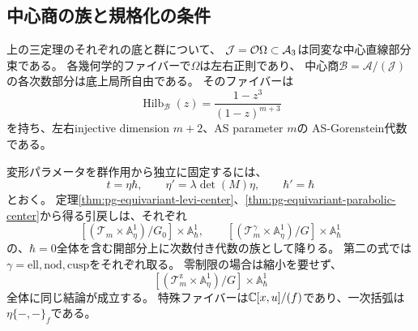 \subsection{中心商の族と規格化の条件}

\begin{corollary}[同変な正則中心商族]
\label{cor:pg-equivariant-central-quotient}
上の三定理のそれぞれの底と群について、
$\mathcal J=\mathcal O\Omega\subset\mathcal A_3$は同変な中心直線部分束である。
各幾何学的ファイバーで$\Omega$は左右正則であり、
中心商$\mathcal B=\mathcal A/(\mathcal J)$の各次数部分は底上局所自由である。
そのファイバーは
\begin{equation}
 \operatorname{Hilb}_{\mathcal B}(z)
 =\frac{1-z^3}{(1-z)^{m+3}}
 \label{eq:pg-equivariant-quotient-hilbert}
\end{equation}
を持ち、左右injective dimension $m+2$、AS parameter $m$の
AS-Gorenstein代数である。

変形パラメータを群作用から独立に固定するには、
\begin{equation}
 t=\eta\hbar,\qquad
 \eta'=\lambda\det(M)\eta,\qquad \hbar'=\hbar
 \label{eq:pg-equivariant-fixed-parameter}
\end{equation}
とおく。
定理\ref{thm:pg-equivariant-levi-center}、\ref{thm:pg-equivariant-parabolic-center}から得る引戻しは、それぞれ
\begin{equation}
 \left[(\mathcal T_m\times\mathbb A^1_\eta)/G_0\right]
       \times\mathbb A^1_\hbar,
 \qquad
 \left[(\mathcal T_m^\gamma\times\mathbb A^1_\eta)/G\right]
       \times\mathbb A^1_\hbar
 \label{eq:pg-equivariant-quotient-stacks}
\end{equation}
の、$\hbar=0$全体を含む開部分上に次数付き代数の族として降りる。
第二の式では$\gamma=\mathrm{ell},\mathrm{nod},\mathrm{cusp}$をそれぞれ取る。
零制限の場合は縮小を要せず、
\begin{equation}
 \left[(\mathcal T_m^{\mathrm z}\times\mathbb A^1_\eta)/G\right]
       \times\mathbb A^1_\hbar
 \label{eq:pg-equivariant-zero-quotient-stack}
\end{equation}
全体に同じ結論が成立する。
特殊ファイバーは$\mathbb C[x,u]/(f)$であり、一次括弧は
$\eta\{-,-\}_f$である。
\end{corollary}
